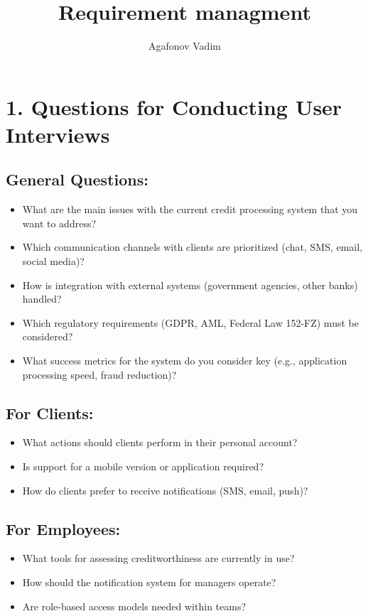 \documentclass[a4paper,12pt]{article}
\title{Requirement managment}
\author{Agafonov Vadim}
\date{}
\begin{document}
\maketitle

\section*{1. Questions for Conducting User Interviews}

\subsection*{General Questions:}
\begin{itemize}
    \item What are the main issues with the current credit processing system that you want to address?
    \item Which communication channels with clients are prioritized (chat, SMS, email, social media)?
    \item How is integration with external systems (government agencies, other banks) handled?
    \item Which regulatory requirements (GDPR, AML, Federal Law 152-FZ) must be considered?
    \item What success metrics for the system do you consider key (e.g., application processing speed, fraud reduction)?
\end{itemize}

\subsection*{For Clients:}
\begin{itemize}
    \item What actions should clients perform in their personal account?
    \item Is support for a mobile version or application required?
    \item How do clients prefer to receive notifications (SMS, email, push)?
\end{itemize}

\subsection*{For Employees:}
\begin{itemize}
    \item What tools for assessing creditworthiness are currently in use?
    \item How should the notification system for managers operate?
    \item Are role-based access models needed within teams?
\end{itemize}
\end{document}
